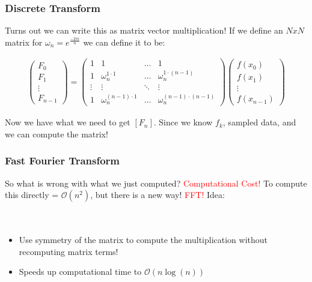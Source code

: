 \documentclass[serif]{beamer}
\begin{document}

\begin{frame}
\frametitle{Discrete Transform}

Turns out we can write this as matrix vector multiplication! If we define an $NxN$ matrix for $\omega_n = e^{\frac{-2\pi i}{n}}$ we can define it to be: 

\begin{align*}
\begin{pmatrix}
F_0\\
F_1\\
\vdots\\
F_{n-1}
\end{pmatrix}
=
\begin{pmatrix}
1 & 1 & \hdots & 1\\
1 & \omega^{1\cdot 1}_{n} &\hdots &  \omega^{1\cdot (n-1)}_{n}\\
 \vdots & \vdots & \ddots & \vdots\\
 1 &  \omega^{(n-1) \cdot 1}_{n} & \hdots &  \omega^{(n-1)\cdot (n-1)}_{n} 
 \end{pmatrix}
 \begin{pmatrix}
 f(x_0)\\
 f(x_1)\\
 \vdots\\
 f(x_{n-1})
 \end{pmatrix}
\end{align*}

Now we have what we need to get $[F_n]$. Since we know $f_k$, sampled data, and we can compute the matrix! 
\end{frame}

\begin{frame}
\frametitle{Fast Fourier Transform} 

So what is wrong with what we just computed? \textcolor{red}{Computational Cost!} To compute this directly = $\mathcal{O}(n^2)$, but there is a new way! \textcolor{red}{FFT!}
Idea: \\
\ \\
\ \\
\begin{itemize}
\item  Use symmetry of the matrix to compute the multiplication without recomputing matrix terms! 
 \item Speeds up computational time to $\mathcal{O}(n\log(n))$ 
 \end{itemize}

\end{frame}
\end{document}
